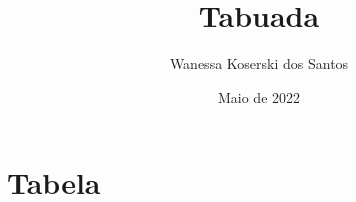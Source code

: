 \documentclass[a4paper]{article}
\title{Tabuada}
\author{Wanessa Koserski dos Santos}
\date{Maio de 2022}
\begin{document}
    \maketitle

    \section{Tabela}

        
\end{document}
